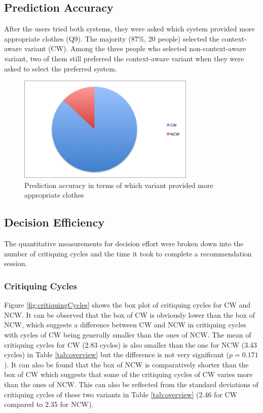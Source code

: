\subsection{Prediction Accuracy} \label{sec:results_pa}

After the users tried both systems, they were asked which system provided more appropriate clothes (Q9). The majority (87\%, 20 people) selected the context-aware variant (CW). Among the three people who selected non-context-aware variant, two of them still preferred the context-aware variant when they were asked to select the preferred system.

\begin{figure}[H]
	\centering
	\includegraphics[height=2in]{figures/predictionAccuracy.png}
	\caption{Prediction accuracy in terms of which variant provided more appropriate clothes}
	\label{fig:predictionAccuracy}
\end{figure}

\subsection{Decision Efficiency} \label{sec:results_de}

The quantitative measurements for decision effort were broken down into the number of critiquing cycles and the time it took to complete a recommendation session.

\subsubsection{Critiquing Cycles} \label{sec:results_de_cc}

Figure \ref{fig:critiquingCycles} shows the box plot of critiquing cycles for CW and NCW. It can be observed that the box of CW is obviously lower than the box of NCW, which suggests a difference between CW and NCW in critiquing cycles with cycles of CW being generally smaller than the ones of NCW. The mean of critiquing cycles for CW (2.83 cycles) is also smaller than the one for NCW (3.43 cycles) in Table \ref{tab:overview} but the difference is not very significant ($p=0.171$). It can also be found that the box of NCW is comparatively shorter than the box of CW which suggests that some of the critiquing cycles of CW varies more than the ones of NCW. This can also be reflected from the standard deviations of critiquing cycles of these two variants in Table \ref{tab:overview} (2.46 for CW compared to 2.35 for NCW).

